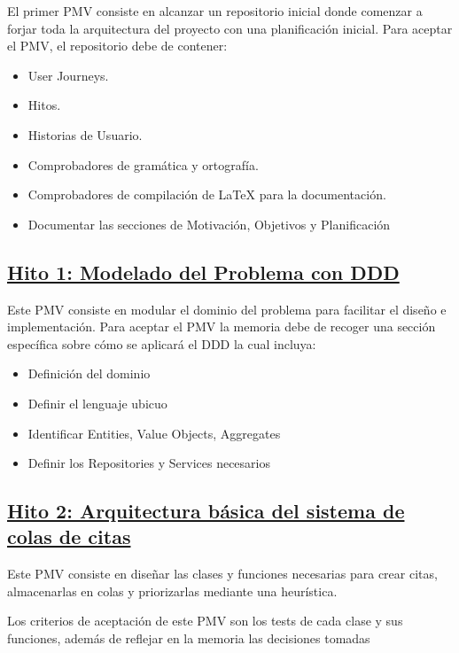 El primer PMV consiste en alcanzar un repositorio inicial donde comenzar a forjar toda la arquitectura del proyecto con una planificación inicial.
Para aceptar el PMV, el repositorio debe de contener:

\begin{itemize}
    \item{User Journeys.}
    \item{Hitos.}
    \item{Historias de Usuario.}
    \item{Comprobadores de gramática y ortografía.}
    \item{Comprobadores de compilación de LaTeX para la documentación.}
    \item{Documentar las secciones de Motivación, Objetivos y Planificación}
\end{itemize}

\subsection*{\href{https://github.com/RubenDelgadoPareja/TFG-Triage-Inteligente-Consulta-Medica/milestone/7}{Hito 1: Modelado del Problema con DDD}}

Este PMV consiste en modular el dominio del problema para facilitar el diseño e implementación.
Para aceptar el PMV la memoria debe de recoger una sección específica sobre cómo se aplicará el DDD la cual incluya:

\begin{itemize}
    \item {Definición del dominio}
    \item {Definir el lenguaje ubicuo}
    \item {Identificar Entities, Value Objects, Aggregates}
    \item {Definir los Repositories y Services necesarios}
\end{itemize}


\subsection*{\href{https://github.com/RubenDelgadoPareja/TFG-Triage-Inteligente-Consulta-Medica/milestone/2}{Hito 2: Arquitectura básica del sistema de colas de citas}}

Este PMV consiste en diseñar las clases y funciones necesarias para crear citas, almacenarlas en colas y priorizarlas mediante una heurística.

Los criterios de aceptación de este PMV son los tests de cada clase y sus funciones, además de reflejar en la memoria las decisiones tomadas

